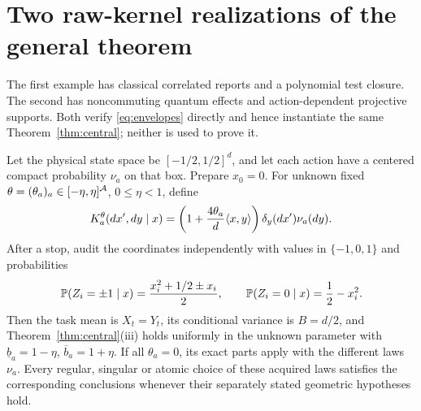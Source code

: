 \section{Two raw-kernel realizations of the general theorem}\label{sec:realizations}
The first example has classical correlated reports and a polynomial test closure. The second has noncommuting quantum effects and action-dependent projective supports. Both verify \eqref{eq:envelopes} directly and hence instantiate the same Theorem~\ref{thm:central}; neither is used to prove it.

\begin{theorem}\label{thm:classical}
Let the physical state space be $[-1/2,1/2]^d$, and let each action have a centered compact probability $\nu_a$ on that box. Prepare $x_0=0$. For unknown fixed $\theta=(\theta_a)_a\in[-\eta,\eta]^{\mathcal A}$, $0\le\eta<1$, define
\begin{equation}\label{eq:classical-kernel}
 K_a^\theta(dx',dy\mid x)
 =\left(1+\frac{4\theta_a}{d}\langle x,y\rangle\right)\delta_y(dx')\nu_a(dy).
\end{equation}
After a stop, audit the coordinates independently with values in $\{-1,0,1\}$ and probabilities
\[
 \mathbb P(Z_i=\pm1\mid x)=\frac{x_i^2+1/2\pm x_i}{2},\qquad
 \mathbb P(Z_i=0\mid x)=\frac12-x_i^2.
\]
Then the task mean is $X_t=Y_t$, its conditional variance is $B=d/2$, and Theorem~\ref{thm:central}\textup{(iii)} holds uniformly in the unknown parameter with $\underline b_a=1-\eta$, $\overline b_a=1+\eta$. If all $\theta_a=0$, its exact parts apply with the different laws $\nu_a$. Every regular, singular or atomic choice of these acquired laws satisfies the corresponding conclusions whenever their separately stated geometric hypotheses hold.
\end{theorem}
